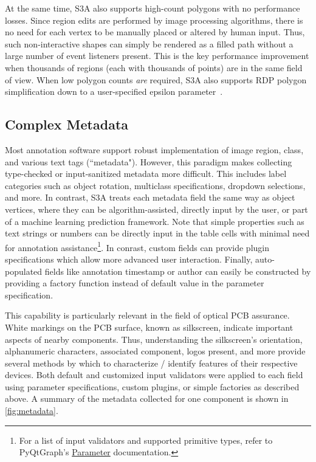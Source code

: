 \makeComplexRegionFig

At the same time, S3A also supports high-count polygons with no performance losses.
Since region edits are performed by image processing algorithms, there is no need for each vertex to be manually placed or altered by human input.
Thus, such non-interactive shapes can simply be rendered as a filled path without a large number of event listeners present.
This is the key performance improvement when thousands of regions (each with thousands of points) are in the same field of view.
When low polygon counts \emph{are} required, S3A also supports RDP polygon simplification down to a user-specified epsilon parameter~\citep{ramer_iterative_1972}.

\subsection{Complex Metadata}
Most annotation software support robust implementation of image region, class, and various text tags (``metadata").
However, this paradigm makes collecting type-checked or input-sanitized metadata more difficult.
This includes label categories such as object rotation, multiclass specifications, dropdown selections, and more.
In contrast, S3A treats each metadata field the same way as object vertices, where they can be algorithm-assisted, directly input by the user, or part of a machine learning prediction framework.
Note that simple properties such as text strings or numbers can be directly input in the table cells with minimal need for annotation assistance\footnote{For a list of input validators and supported primitive types, refer to PyQtGraph's \href{https://pyqtgraph.readthedocs.io/en/latest/parametertree/parametertypes.html}{Parameter} documentation.}.
In conrast, custom fields can provide plugin specifications which allow more advanced user interaction.
Finally, auto-populated fields like annotation timestamp or author can easily be constructed by providing a factory function instead of default value in the parameter specification.

This capability is particularly relevant in the field of optical PCB assurance.
White markings on the PCB surface, known as silkscreen, indicate important aspects of nearby components.
Thus, understanding the silkscreen's orientation, alphanumeric characters, associated component, logos present, and more provide several methods by which to characterize / identify features of their respective devices.
Both default and customized input validators were applied to each field using parameter specifications, custom plugins, or simple factories as described above.
A summary of the metadata collected for one component is shown in \autoref{fig:metadata}.

